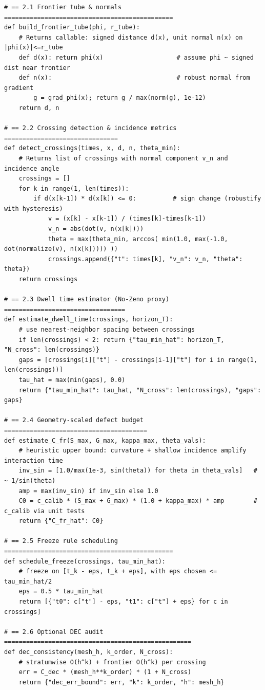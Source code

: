 \documentclass[10pt]{article}
\begin{document}
\begin{lstlisting}
# == 2.1 Frontier tube & normals ==============================================
def build_frontier_tube(phi, r_tube):
    # Returns callable: signed distance d(x), unit normal n(x) on |phi(x)|<=r_tube
    def d(x): return phi(x)                    # assume phi ~ signed dist near frontier
    def n(x):                                  # robust normal from gradient
        g = grad_phi(x); return g / max(norm(g), 1e-12)
    return d, n

# == 2.2 Crossing detection & incidence metrics ===============================
def detect_crossings(times, x, d, n, theta_min):
    # Returns list of crossings with normal component v_n and incidence angle
    crossings = []
    for k in range(1, len(times)):
        if d(x[k-1]) * d(x[k]) <= 0:          # sign change (robustify with hysteresis)
            v = (x[k] - x[k-1]) / (times[k]-times[k-1])
            v_n = abs(dot(v, n(x[k])))
            theta = max(theta_min, arccos( min(1.0, max(-1.0, dot(normalize(v), n(x[k])))) ))
            crossings.append({"t": times[k], "v_n": v_n, "theta": theta})
    return crossings

# == 2.3 Dwell time estimator (No-Zeno proxy) =================================
def estimate_dwell_time(crossings, horizon_T):
    # use nearest-neighbor spacing between crossings
    if len(crossings) < 2: return {"tau_min_hat": horizon_T, "N_cross": len(crossings)}
    gaps = [crossings[i]["t"] - crossings[i-1]["t"] for i in range(1, len(crossings))]
    tau_hat = max(min(gaps), 0.0)
    return {"tau_min_hat": tau_hat, "N_cross": len(crossings), "gaps": gaps}

# == 2.4 Geometry-scaled defect budget =======================================
def estimate_C_fr(S_max, G_max, kappa_max, theta_vals):
    # heuristic upper bound: curvature + shallow incidence amplify interaction time
    inv_sin = [1.0/max(1e-3, sin(theta)) for theta in theta_vals]   # ~ 1/sin(theta)
    amp = max(inv_sin) if inv_sin else 1.0
    C0 = c_calib * (S_max + G_max) * (1.0 + kappa_max) * amp        # c_calib via unit tests
    return {"C_fr_hat": C0}

# == 2.5 Freeze rule scheduling ==============================================
def schedule_freeze(crossings, tau_min_hat):
    # freeze on [t_k - eps, t_k + eps], with eps chosen <= tau_min_hat/2
    eps = 0.5 * tau_min_hat
    return [{"t0": c["t"] - eps, "t1": c["t"] + eps} for c in crossings]

# == 2.6 Optional DEC audit ===================================================
def dec_consistency(mesh_h, k_order, N_cross):
    # stratumwise O(h^k) + frontier O(h^k) per crossing
    err = C_dec * (mesh_h**k_order) * (1 + N_cross)
    return {"dec_err_bound": err, "k": k_order, "h": mesh_h}


\end{lstlisting}
\end{document}
